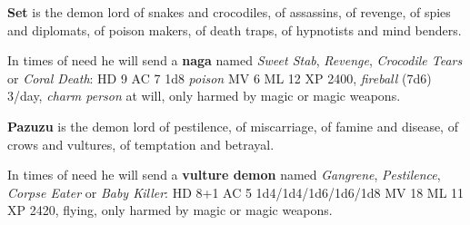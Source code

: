 \documentclass[11pt]{bxart}
\begin{document}
\textbf{Set} is the demon lord of snakes and crocodiles, of assassins, of revenge, of spies and diplomats, of poison makers, of death traps, of hypnotists and mind benders.

In times of need he will send a \textbf{naga} named \textit{Sweet Stab}, \textit{Revenge}, \textit{Crocodile Tears} or \textit{Coral Death}: HD 9 AC 7 1d8 \textit{poison} MV 6 ML 12 XP 2400, \textit{fireball} (7d6) 3/day, \textit{charm person} at will, only harmed by magic or magic weapons.

\textbf{Pazuzu} is the demon lord of pestilence, of miscarriage, of famine and disease, of crows and vultures, of temptation and betrayal.

In times of need he will send a \textbf{vulture demon} named \textit{Gangrene}, \textit{Pestilence}, \textit{Corpse Eater} or \textit{Baby Killer}: HD 8+1 AC 5 1d4/1d4/1d6/1d6/1d8 MV 18 ML 11 XP 2420, flying, only harmed by magic or magic weapons.
\end{document}
